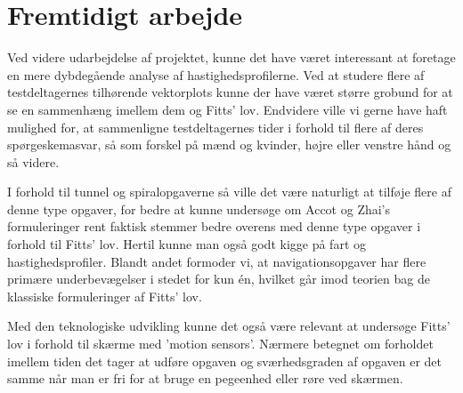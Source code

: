 \section*{Fremtidigt arbejde}
Ved videre udarbejdelse af projektet, kunne det have været interessant at foretage en mere dybdegående analyse af hastighedsprofilerne. Ved at studere flere af testdeltagernes tilhørende vektorplots kunne der have været større grobund for at se en sammenhæng imellem dem og Fitts' lov. Endvidere ville vi gerne have haft mulighed for, at sammenligne testdeltagernes tider i forhold til flere af deres spørgeskemasvar, så som forskel på mænd og kvinder, højre eller venstre hånd og så videre.

I forhold til tunnel og spiralopgaverne så ville det være naturligt at tilføje flere af denne type opgaver, for bedre at kunne undersøge om Accot og Zhai's formuleringer rent faktisk stemmer bedre overens med denne type opgaver i forhold til Fitts' lov. Hertil kunne man også godt kigge på fart og hastighedsprofiler. Blandt andet formoder vi, at navigationsopgaver har flere primære underbevægelser i stedet for kun én, hvilket går imod teorien bag de klassiske formuleringer af Fitts' lov.

Med den teknologiske udvikling kunne det også være relevant at undersøge Fitts' lov i forhold til skærme med 'motion sensors'. Nærmere betegnet om forholdet imellem tiden det tager at udføre opgaven og sværhedsgraden af opgaven er det samme når man er fri for at bruge en pegeenhed eller røre ved skærmen.


\nocite{*}

\printbibliography

